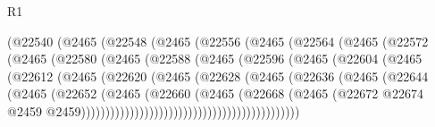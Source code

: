 \begin{lexlean}{R1}
\begin{coremodule}
                        (@22540
                          (@2465
                            (@22548
                              (@2465
                                (@22556
                                  (@2465
                                    (@22564
                                      (@2465
                                        (@22572
                                          (@2465
                                            (@22580
                                              (@2465
                                                (@22588
                                                  (@2465
                                                    (@22596
                                                      (@2465
                                                        (@22604
                                                          (@2465
                                                            (@22612
                                                              (@2465
                                                                (@22620
                                                                  (@2465
                                                                    (@22628
                                                                      (@2465
                                                                        (@22636
                                                                          (@2465
                                                                            (@22644
                                                                              (@2465
                                                                                (@22652
                                                                                  (@2465
                                                                                    (@22660
                                                                                      (@2465
                                                                                        (@22668
                                                                                          (@2465
                                                                                            (@22672
                                                                                              @22674
                                                                                              @2459
                                                                                              @2459)))))))))))))))))))))))))))))))))))))))))))))

\end{coremodule}
\end{lexlean}
